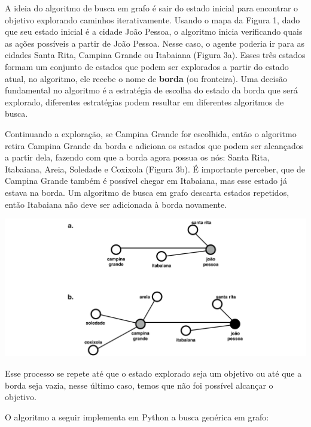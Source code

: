 \documentclass[brazil,]{article}
\let\origfigure=\figure
\let\endorigfigure=\endfigure
\renewenvironment{figure}[1][]{%
\origfigure[H]
}{%
\endorigfigure
}
\begin{document}
A ideia do algoritmo de busca em grafo é sair do estado inicial para
encontrar o objetivo explorando caminhos iterativamente. Usando o mapa
da Figura 1, dado que seu estado inicial é a cidade João Pessoa, o
algoritmo inicia verificando quais as ações possíveis a partir de João
Pessoa. Nesse caso, o agente poderia ir para as cidades Santa Rita,
Campina Grande ou Itabaiana (Figura 3a). Esses três estados formam um
conjunto de estados que podem ser explorados a partir do estado atual,
no algoritmo, ele recebe o nome de \textbf{borda} (ou fronteira). Uma
decisão fundamental no algoritmo é a estratégia de escolha do estado da
borda que será explorado, diferentes estratégias podem resultar em
diferentes algoritmos de busca.

Continuando a exploração, se Campina Grande for escolhida, então o
algoritmo retira Campina Grande da borda e adiciona os estados que podem
ser alcançados a partir dela, fazendo com que a borda agora possua os
nós: Santa Rita, Itabaiana, Areia, Soledade e Coxixola (Figura 3b). É
importante perceber, que de Campina Grande também é possível chegar em
Itabaiana, mas esse estado já estava na borda. Um algoritmo de busca em
grafo descarta estados repetidos, então Itabaiana não deve ser
adicionada à borda novamente.

\begin{figure}
\centering
\includegraphics{pbmapa-algoritmo.png}
\caption{a) Estado inicial João Pessoa e os estados acessíveis a partir
dele formando a borda. b) Estado Campina Grande explorado, estado João
Pessoa já visitado e os estados restantes formando a borda.}
\end{figure}

Esse processo se repete até que o estado explorado seja um objetivo ou
até que a borda seja vazia, nesse último caso, temos que não foi
possível alcançar o objetivo.

O algoritmo a seguir implementa em Python a busca genérica em grafo:
\end{document}
